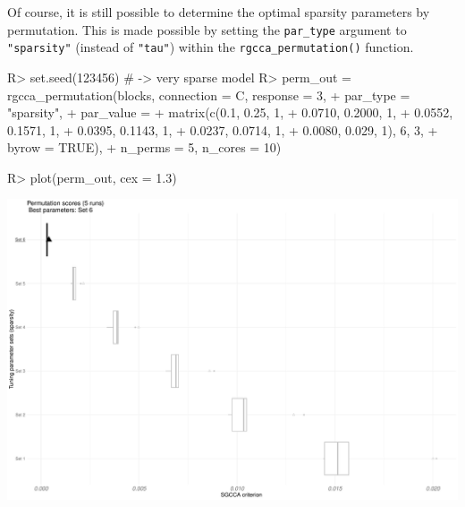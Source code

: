 \documentclass[
]{jss}
\begin{document}
\normalsize

Of course, it is still possible to determine the optimal sparsity
parameters by permutation. This is made possible by setting the
\texttt{par\_type} argument to \texttt{"sparsity"} (instead of
\texttt{"tau"}) within the \texttt{rgcca\_permutation()} function.

\footnotesize

\begin{CodeChunk}
\begin{CodeInput}
R> set.seed(123456) # -> very sparse model
R> perm_out = rgcca_permutation(blocks, connection = C, response = 3,
+                                 par_type = "sparsity",
+                                 par_value = 
+                                   matrix(c(0.1, 0.25, 1, 
+                                            0.0710, 0.2000, 1,
+                                            0.0552, 0.1571, 1, 
+                                            0.0395, 0.1143, 1,
+                                            0.0237, 0.0714, 1, 
+                                            0.0080, 0.029, 1), 6, 3, 
+                                          byrow = TRUE),
+                                 n_perms = 5, n_cores = 10)
\end{CodeInput}
\end{CodeChunk}

\normalsize

\footnotesize

\begin{CodeChunk}
\begin{CodeInput}
R> plot(perm_out, cex = 1.3)
\end{CodeInput}


\begin{center}\includegraphics{RGCCA_vignette_files/figure-latex/unnamed-chunk-48-1} \end{center}

\end{CodeChunk}
\end{document}
